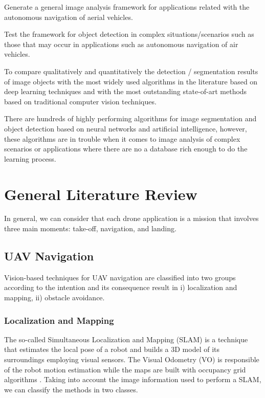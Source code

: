Generate a general image analysis framework for applications related with the autonomous navigation of aerial vehicles.

Test the framework for object detection in complex situations/scenarios such as those that may occur in applications such as autonomous navigation of air vehicles.

To compare qualitatively and quantitatively the detection / segmentation results of image objects with the most widely used algorithms in the literature based on deep learning techniques and with the most outstanding state-of-art methods based on traditional computer vision techniques.

There are hundreds of highly performing algorithms for image segmentation and object detection based on neural networks and artificial intelligence, however, these algorithms are in trouble when it comes to image analysis of complex scenarios or applications where there are no a database rich enough to do the learning process.


\section{General Literature Review}
In general, we can consider that each drone application is a mission that involves three main moments: take-off, navigation, and landing.   



\subsection{UAV Navigation}
Vision-based techniques for UAV navigation are classified into two groups according to the intention and its consequence result in i) localization and mapping, ii) obstacle avoidance.

\subsubsection{Localization and Mapping}
The so-called Simultaneous Localization and Mapping (SLAM) is a technique that estimates the local pose of a robot and builds a 3D model of its surroundings employing visual sensors. The Visual Odometry (VO) \cite{Scaramuzza.Fraundorfer:RAM:2011} is responsible of the robot motion estimation while the maps are built with occupancy grid algorithms \cite{Thrun.Bu:AI:1996}. Taking into account the image information used to perform a SLAM, we can classify the methods in two classes.

